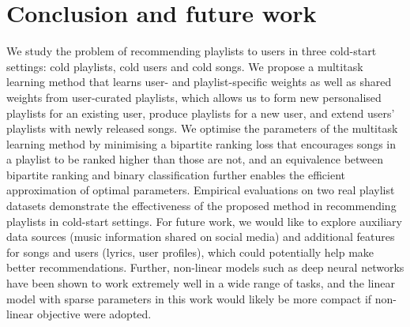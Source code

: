 \section{Conclusion and future work}

We study the problem of recommending playlists to users in three cold-start settings:
cold playlists, cold users and cold songs.
We propose a multitask learning method that learns user- and playlist-specific weights 
as well as shared weights from user-curated playlists,
which allows us to form new personalised playlists for an existing user, %
produce playlists for a new user, %
and extend users' playlists with newly released songs. %
We optimise the parameters of the multitask learning method by minimising a bipartite ranking loss
that encourages songs in a playlist to be ranked higher than those are not,
and an equivalence between bipartite ranking and binary classification further enables the efficient 
approximation of optimal parameters.
Empirical evaluations on two real playlist datasets demonstrate the effectiveness of the proposed
method in recommending playlists in cold-start settings.
%
%
For future work, we would like to explore 
auxiliary data sources (\eg music information shared on social media) and additional features for songs and users 
(\eg lyrics, user profiles), %
which could potentially help make better recommendations.
Further, non-linear models such as deep neural networks have been shown to work extremely well in a wide range of tasks,
and the linear model with sparse parameters in this work would likely be more compact if non-linear objective were adopted.

